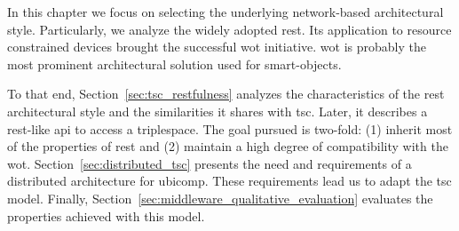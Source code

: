 In this chapter we focus on selecting the underlying network-based architectural style.
Particularly, we analyze the widely adopted \acf{rest}.
Its application to resource constrained devices brought the successful \ac{wot} initiative.
\ac{wot} is probably the most prominent architectural solution used for smart-objects. %


To that end, Section~\ref{sec:tsc_restfulness} analyzes the characteristics of the \ac{rest} architectural style and the similarities it shares with \ac{tsc}.
Later, it describes a \ac{rest}-like \ac{api} to access a triplespace. %
The goal pursued is two-fold: (1) inherit most of the properties of \ac{rest} and (2) maintain a high degree of compatibility with the \ac{wot}.
Section~\ref{sec:distributed_tsc} presents the need and requirements of a distributed architecture for \ac{ubicomp}.
These requirements lead us to adapt the \ac{tsc} model.
Finally, Section~\ref{sec:middleware_qualitative_evaluation} evaluates the properties achieved with this model.








%
%
%